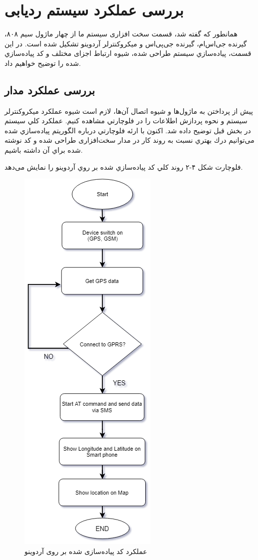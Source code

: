 \section{بررسی عملکرد سیستم ردیابی}
همانطور كه گفته شد، قسمت سخت‌ افزاری سیستم ما از چهار ماژول سیم ۸۰۸، گیرنده جی‌اس‌ام، گیرنده جی‌پی‌اس و میکروکنترلر آردوینو تشکیل شده است. در اين قسمت، پياده‌سازي سيستم طراحی شده، شيوه ارتباط اجزای مختلف و كد پياده‌سازي شده را توضيح خواهیم داد.
\subsection{بررسی عملکرد مدار}
پيش از پرداختن به ماژول‌ها و شيوه اتصال آن‌ها، لازم است شيوه عملكرد ميكروكنترلر سيستم و نحوه پردازش اطلاعات را در فلوچارتي مشاهده كنيم. عملكرد كلي سيستم در بخش قبل توضيح داده شد. اكنون با ارئه فلوچارتي درباره الگوريتم پياده‌سازي شده می‌توانیم درك بهتري نسبت به روند كار در مدار سخت‌افزاری طراحی شده و كد نوشته شده براي آن داشته باشيم.

\newpage
فلوچارت شكل ۴-۲ روند كلي كد پياده‌سازي شده بر روي آردوینو را نمايش می‌دهد.
\begin{figure}[h!]
	\centering
	\includegraphics[width=.4\textwidth]{tracking-flowchart}
	\caption{عملکرد کد پیاده‌سازی شده بر روی آردوینو \cite{Rahman2016,Alshamsi,Hazza}}
\end{figure}



